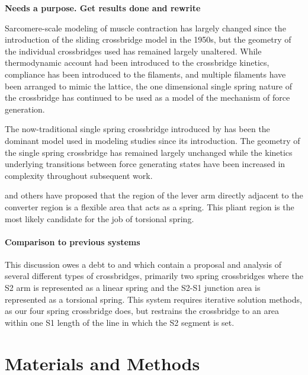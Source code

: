 \documentclass[]{article}
\begin{document}

\textbf{Needs a purpose. Get results done and rewrite}

Sarcomere-scale modeling of muscle contraction has largely changed since the introduction of the sliding crossbridge model in the 1950s, but the geometry of the individual crossbridges used has remained largely unaltered. 
While thermodynamic account had been introduced to the crossbridge kinetics, compliance has been introduced to the filaments, and multiple filaments have been arranged to mimic the lattice, the one dimensional single spring nature of the crossbridge has continued to be used as a model of the mechanism of force generation.

The now-traditional single spring crossbridge introduced by \citet{Huxley:1957:p255} has been the dominant model used in modeling studies since its introduction. 
The geometry of the single spring crossbridge has remained largely unchanged while the kinetics underlying transitions between force generating states have been increased in complexity throughout subsequent work. \citep{Pate:1989:p181, Daniel:1998:p1611, Chase:2004:p204, Tanner:2007:pe115}

\citet{Houdusse:2001:p182} and others have proposed that the region of the lever arm directly adjacent to the converter region is a flexible area that acts as a spring. This pliant region is the most likely candidate for the job of torsional spring. 

\paragraph{Comparison to previous systems} %
This discussion owes a debt to \citet{Schoenberg:1980:p1802} and \citet{Schoenberg:1980:p1627} which contain a proposal and analysis of several different types of crossbridges, primarily two spring crossbridges where the S2 arm is represented as a linear spring and the S2-S1 junction area is represented as a torsional spring. 
This system requires iterative solution methods, as our four spring crossbridge does, but restrains the crossbridge to an area within one S1 length of the line in which the S2 segment is set.



\section{Materials and Methods}  %
\end{document}
